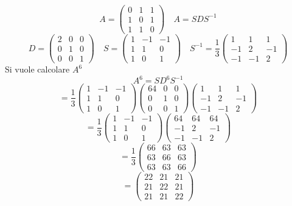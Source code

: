 \documentclass[a4paper]{article}
\theoremstyle{break}
\theoremstyle{break}
\theoremstyle{break}
\theoremstyle{break}
\begin{document}
\begin{example}
  \[
    A = \begin{pmatrix} 
      0 & 1 & 1\\
      1 & 0 & 1\\
      1 & 1 & 0
    \end{pmatrix} 
    \quad
    A = SDS^{-1}
  \] 
  \[
  D = \begin{pmatrix} 
    2 & 0 & 0\\
    0 & 1 & 0\\
    0 & 0 & 1
  \end{pmatrix} 
  \quad
  S = \begin{pmatrix} 
    1 & -1 & -1\\
    1 & 1 & 0\\
    1 & 0 & 1
  \end{pmatrix} 
  \quad
  S^{-1} = \frac{1}{3} \begin{pmatrix} 
    1 & 1 & 1\\
    -1 & 2 & -1\\
    -1 & -1 & 2
  \end{pmatrix} 
  \] 
  Si vuole calcolare \( A^6 \) 
  \[
  A^6 = SD^6S^{-1}
  \] 
  \[
  = \frac{1}{3} \begin{pmatrix} 
    1 & -1 & -1\\
    1 & 1 & 0\\
    1 & 0 & 1
  \end{pmatrix}
  \begin{pmatrix} 
    64 & 0 & 0\\
    0 & 1 & 0\\
    0 & 0 & 1
  \end{pmatrix}
  \begin{pmatrix} 
    1 & 1 & 1\\
    -1 & 2 & -1\\
    -1 & -1 & 2
  \end{pmatrix}
  \] 
  \[
  = \frac{1}{3}\begin{pmatrix} 
    1 & -1 & -1\\
    1 & 1 & 0\\
    1 & 0 & 1
  \end{pmatrix} 
  \begin{pmatrix} 
    64 & 64 & 64\\
    -1 & 2 & -1\\
    -1 & -1 & 2
  \end{pmatrix} 
  \] 
  \[
  = \frac{1}{3}\begin{pmatrix} 
    66 & 63 & 63\\
    63 & 66 & 63\\
    63 & 63 & 66
  \end{pmatrix} 
  \] 
  \[
  = \begin{pmatrix} 
    22 & 21 & 21\\
    21 & 22 & 21\\
    21 & 21 & 22
  \end{pmatrix} 
  \] 
\end{example}
\end{document}
